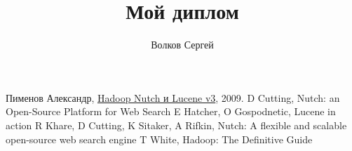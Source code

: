 \documentclass[a4paper,10pt]{report}
\title{Мой диплом}
\author{Волков Сергей}
\begin{document}
\maketitle

\begin{abstract}
\end{abstract}






\begin{thebibliography}{9}
 Пименов Александр, \href{http://mmcg.z52.ru/drupal/node/3}{Hadoop Nutch и Lucene v3}, 2009.
 D Cutting, Nutch: an Open-Source Platform for Web Search
 E Hatcher, O Gospodnetic, Lucene in action
 R Khare, D Cutting, K Sitaker, A Rifkin, Nutch: A flexible and scalable open-source web search engine
 T White, Hadoop: The Definitive Guide

\end{thebibliography}
\end{document}

